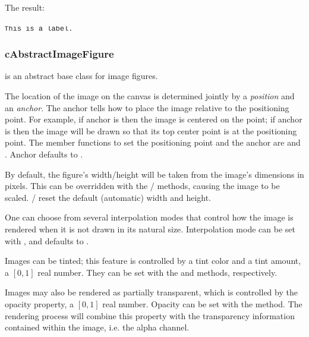 
The result:

\begin{center}
\includegraphics[scale=4.0]{figures/figure-label}
\end{center}


\subsubsection{cAbstractImageFigure}

 is an abstract base class for image figures.

The location of the image on the canvas is determined jointly by a
\textit{position} and an \textit{anchor}. The anchor tells how to
place the image relative to the positioning point. For example,
if anchor is  then the image is centered on the point;
if anchor is  then the image will be drawn so that its top
center point is at the positioning point. The member functions to set the
positioning point and the anchor are  and
. Anchor defaults to .

By default, the figure's width/height will be taken from the image's
dimensions in pixels. This can be overridden with the /
 methods, causing the image to be scaled.
 /  reset the default (automatic) width
and height.

One can choose from several interpolation modes that control how the image
is rendered when it is not drawn in its natural size. Interpolation mode
can be set with , and defaults to
.

Images can be tinted; this feature is controlled by a tint color and a tint
amount, a $[0,1]$ real number. They can be set with the
 and  methods, respectively.

Images may also be rendered as partially transparent, which is controlled by
the opacity property, a $[0,1]$ real number. Opacity can be set with the
 method. The rendering process will combine this
property with the transparency information contained within the image, i.e.
the alpha channel.


